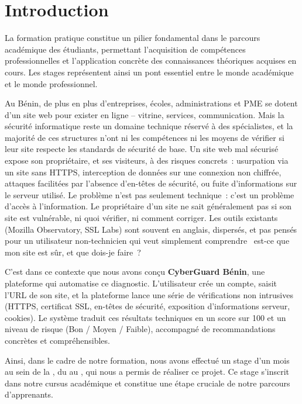 \chapter*{Introduction}

La formation pratique constitue un pilier fondamental dans le parcours acad\'emique
des \'etudiants, permettant l'acquisition de comp\'etences professionnelles et
l'application concr\`ete des connaissances th\'eoriques acquises en cours. Les stages
repr\'esentent ainsi un pont essentiel entre le monde acad\'emique et le monde
professionnel.

Au B\'enin, de plus en plus d'entreprises, \'ecoles, administrations et PME se dotent
d'un site web pour exister en ligne -- vitrine, services, communication. Mais la
s\'ecurit\'e informatique reste un domaine technique r\'eserv\'e \`a des sp\'ecialistes, et
la majorit\'e de ces structures n'ont ni les comp\'etences ni les moyens de v\'erifier
si leur site respecte les standards de s\'ecurit\'e de base. Un site web mal s\'ecuris\'e
expose son propri\'etaire, et ses visiteurs, \`a des risques concrets~: usurpation via
un site sans HTTPS, interception de donn\'ees sur une connexion non chiffr\'ee,
attaques facilit\'ees par l'absence d'en-t\^etes de s\'ecurit\'e, ou fuite d'informations
sur le serveur utilis\'e. Le probl\`eme n'est pas seulement technique~: c'est un
probl\`eme d'acc\`es \`a l'information. Le propri\'etaire d'un site ne sait g\'en\'eralement
pas si son site est vuln\'erable, ni quoi v\'erifier, ni comment corriger. Les outils
existants (Mozilla Observatory, SSL Labs) sont souvent en anglais, dispers\'es, et
pas pens\'es pour un utilisateur non-technicien qui veut simplement comprendre
\og~est-ce que mon site est s\^ur, et que dois-je faire~?~\fg{}

C'est dans ce contexte que nous avons con\c{c}u \textbf{CyberGuard B\'enin}, une
plateforme qui automatise ce diagnostic. L'utilisateur cr\'ee un compte, saisit
l'URL de son site, et la plateforme lance une s\'erie de v\'erifications non
intrusives (HTTPS, certificat SSL, en-t\^etes de s\'ecurit\'e, exposition
d'informations serveur, cookies). Le syst\`eme traduit ces r\'esultats techniques en
un score sur 100 et un niveau de risque (Bon / Moyen / Faible), accompagn\'e de
recommandations concr\`etes et compr\'ehensibles.

Ainsi, dans le cadre de notre formation, nous avons effectu\'e un stage d'un
mois au sein de la \entreprise{}, du \datedebut{} au \datefin{}, qui nous a
permis de r\'ealiser ce projet. Ce stage s'inscrit dans notre cursus acad\'emique
et constitue une \'etape cruciale de notre parcours d'apprenants.

